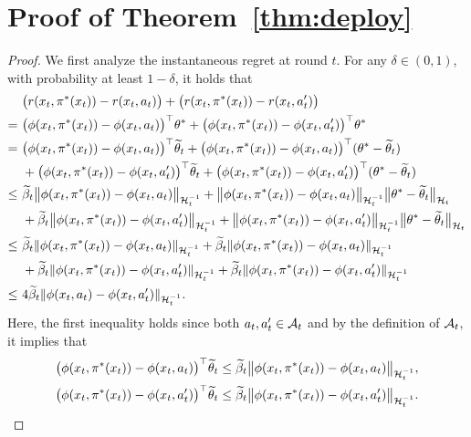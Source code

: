 \section{Proof of Theorem~\ref{thm:deploy}}
\begin{proof}
    We first analyze the instantaneous regret at round $t$. For any $\delta \in (0, 1)$, with probability at least $1-\delta$, it holds that
    \begin{align*}
      & \big(r(x_t, \pi^*(x_t)) - r(x_t, a_t)\big) + \big(r(x_t, \pi^*(x_t)) - r(x_t, a_t')\big) \\
      = \ &\big(\phi(x_t, \pi^*(x_t)) - \phi(x_t, a_t)\big)^{\top} \theta^* + \big(\phi(x_t, \pi^*(x_t)) - \phi(x_t, a_t')\big)^{\top} \theta^* \\
      = \ & \big(\phi(x_t, \pi^*(x_t)) - \phi(x_t, a_t)\big)^{\top} \widetilde{\theta}_t + \big(\phi(x_t, \pi^*(x_t)) - \phi(x_t, a_t)\big)^{\top} (\theta^* - \widetilde{\theta}_t) \\
      & + \big(\phi(x_t, \pi^*(x_t)) - \phi(x_t, a_t')\big)^{\top} \widetilde{\theta}_t + \big(\phi(x_t, \pi^*(x_t)) - \phi(x_t, a_t')\big)^{\top} (\theta^* - \widetilde{\theta}_t) \\
      \leq \ & \widetilde{\beta}_t \big\lVert\phi(x_t, \pi^*(x_t)) - \phi(x_t, a_t)\big\rVert_{\mathcal{H}_t^{-1}}  + \big\lVert\phi(x_t, \pi^*(x_t)) - \phi(x_t, a_t)\big\rVert_{\mathcal{H}_t^{-1}} \big\lVert\theta^* - \widetilde{\theta}_t\big\rVert_{\mathcal{H}_t}\\
      & + \widetilde{\beta}_t \big\lVert\phi(x_t, \pi^*(x_t)) - \phi(x_t, a'_t)\big\rVert_{\mathcal{H}_t^{-1}}  + \big\lVert\phi(x_t, \pi^*(x_t)) - \phi(x_t, a'_t)\big\rVert_{\mathcal{H}_t^{-1}} \big\lVert\theta^* - \widetilde{\theta}_t\big\rVert_{\mathcal{H}_t} \\
      \leq \ & \widetilde{\beta}_t \lVert\phi(x_t, \pi^*(x_t)) - \phi(x_t, a_t)\rVert_{\mathcal{H}_t^{-1}} + \widetilde{\beta}_t \lVert\phi(x_t, \pi^*(x_t)) - \phi(x_t, a_t)\rVert_{\mathcal{H}_t^{-1}} \\
      & + \widetilde{\beta}_t \lVert\phi(x_t, \pi^*(x_t)) - \phi(x_t, a_t')\rVert_{\mathcal{H}_t^{-1}} + \widetilde{\beta}_t \lVert\phi(x_t, \pi^*(x_t)) - \phi(x_t, a_t')\rVert_{\mathcal{H}_t^{-1}} \\
      \leq \ & 4 \widetilde{\beta}_t \lVert\phi(x_t, a_t) - \phi(x_t, a_t')\rVert_{\mathcal{H}_t^{-1}}.
    \end{align*}
    Here, the first inequality holds since both $a_t, a'_t \in \mathcal{A}_t$ and by the definition of $\mathcal{A}_t$, it implies that 
    \begin{align*}
        \big(\phi(x_t, \pi^*(x_t)) - \phi(x_t, a_t)\big)^{\top} \thetat_t &\leq \betat_t \bignorm{\phi(x_t, \pi^*(x_t)) - \phi(x_t, a_t)}_{\H_t^{-1}},\\
        \big(\phi(x_t, \pi^*(x_t)) - \phi(x_t, a'_t)\big)^{\top} \thetat_t &\leq \betat_t \bignorm{\phi(x_t, \pi^*(x_t)) - \phi(x_t, a_t')}_{\H_t^{-1}}.

\end{align*}
\end{proof}
